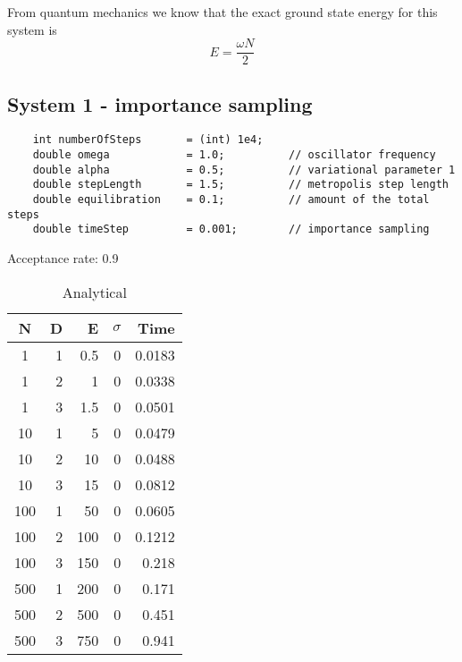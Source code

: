 \documentclass[english, a4paper]{article}
\begin{document}
From quantum mechanics we know that the exact ground state energy for this system is
\begin{equation}
 E = \frac{\omega N}{2}
\end{equation}


\subsection{System 1 - importance sampling}

\begin{lstlisting}
    int numberOfSteps       = (int) 1e4;
    double omega            = 1.0;          // oscillator frequency
    double alpha            = 0.5;          // variational parameter 1
    double stepLength       = 1.5;          // metropolis step length
    double equilibration    = 0.1;          // amount of the total steps
    double timeStep         = 0.001;        // importance sampling
\end{lstlisting}

Acceptance rate: 0.9

\begin{table}[H]
  \centering
  \begin{tabular}{ | c | r | r | r | r |}
    \hline
    N& D& E& $\sigma$& Time \\*
    \hline
    1& 1& 0.5& 0& 0.0183 \\*
    \hline
    1& 2& 1& 0&  0.0338\\*
    \hline
    1& 3& 1.5& 0&  0.0501\\*
    \hline
    10& 1& 5& 0&  0.0479\\*
    \hline
    10& 2& 10& 0&  0.0488\\*
    \hline
    10& 3& 15& 0&  0.0812\\*
    \hline
    100& 1& 50& 0&  0.0605\\*
    \hline
    100& 2& 100& 0&  0.1212\\*
    \hline
    100& 3& 150& 0&  0.218\\*
    \hline
    500& 1& 200& 0&  0.171\\*
    \hline
    500& 2& 500& 0&  0.451\\*
    \hline
    500& 3& 750& 0&  0.941\\*
    \hline
  \end{tabular}
  \caption{Analytical}
  \label{tab:Tabell1}
\end{table}
\end{document}
